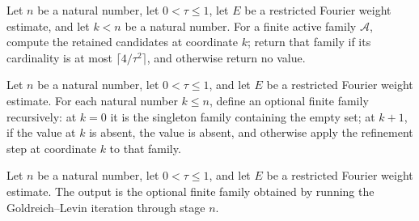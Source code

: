 \begin{definition}
\label{FABL.goldreichLevinRefine}
\leanok
{}
Let $n$ be a natural number, let $0<\tau\le 1$, let $E$ be a restricted Fourier weight
estimate, and let $k<n$ be a natural number. For a finite active family $\mathcal A$,
compute the retained candidates at coordinate $k$; return that family if its cardinality
is at most $\lceil 4/\tau^2\rceil$, and otherwise return no value.
\end{definition}

\begin{definition}
\label{FABL.goldreichLevinRunUpTo}
\leanok
{}
Let $n$ be a natural number, let $0<\tau\le 1$, and let $E$ be a restricted Fourier
weight estimate. For each natural number $k\le n$, define an optional finite family
recursively: at $k=0$ it is the singleton family containing the empty set; at $k+1$, if
the value at $k$ is absent, the value is absent, and otherwise apply the refinement step
at coordinate $k$ to that family.
\end{definition}

\begin{definition}
\label{FABL.goldreichLevinOutput}
\leanok
{}
Let $n$ be a natural number, let $0<\tau\le 1$, and let $E$ be a restricted Fourier
weight estimate. The output is the optional finite family obtained by running the
Goldreich–Levin iteration through stage $n$.
\end{definition}

